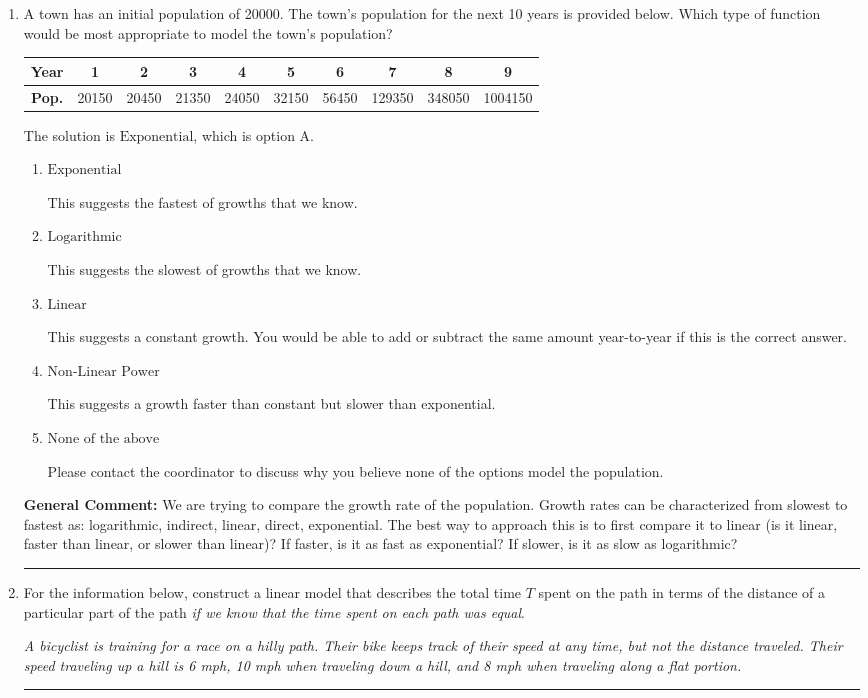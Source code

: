 \documentclass{extbook}[14pt]
\newcommand{\litem}[1]{\item #1

\rule{\textwidth}{0.4pt}}
\begin{document}
\begin{enumerate}\litem{
A town has an initial population of 20000. The town's population for the next 10 years is provided below. Which type of function would be most appropriate to model the town's population?



\begin{tabular}{c|c|c|c|c|c|c|c|c|c}
\textbf{Year} & 1 & 2 & 3 & 4 & 5 & 6 & 7 & 8 & 9 \tabularnewline
\hline
\textbf{Pop.} & 20150 & 20450 & 21350 & 24050 & 32150 & 56450 & 129350 & 348050 & 1004150
\end{tabular} 

The solution is \( \text{Exponential} \), which is option A.\begin{enumerate}[label=\Alph*.]
\item \( \text{Exponential} \)

This suggests the fastest of growths that we know.
\item \( \text{Logarithmic} \)

This suggests the slowest of growths that we know.
\item \( \text{Linear} \)

This suggests a constant growth. You would be able to add or subtract the same amount year-to-year if this is the correct answer.
\item \( \text{Non-Linear Power} \)

This suggests a growth faster than constant but slower than exponential.
\item \( \text{None of the above} \)

Please contact the coordinator to discuss why you believe none of the options model the population.
\end{enumerate}

\textbf{General Comment:} We are trying to compare the growth rate of the population. Growth rates can be characterized from slowest to fastest as: logarithmic, indirect, linear, direct, exponential. The best way to approach this is to first compare it to linear (is it linear, faster than linear, or slower than linear)? If faster, is it as fast as exponential? If slower, is it as slow as logarithmic?
}
\litem{
For the information below, construct a linear model that describes the total time $T$ spent on the path in terms of the distance of a particular part of the path \textit{if we know that the time spent on each path was equal}.

\begin{center}
    \textit{ A bicyclist is training for a race on a hilly path. Their bike keeps track of their speed at any time, but not the distance traveled. Their speed traveling up a hill is 6 mph, 10 mph when traveling down a hill, and 8 mph when traveling along a flat portion. }
\end{center}


}
\end{enumerate}
\end{document}
